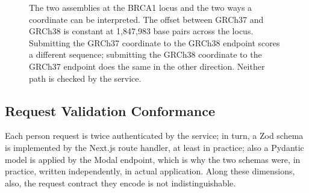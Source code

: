 \documentclass[10pt,journal]{IEEEtran}
\begin{document}
\begin{figure}[!t]
\centering
{}
\caption{The two assemblies at the BRCA1 locus and the two ways a coordinate can be interpreted. The offset between GRCh37 and GRCh38 is constant at 1{,}847{,}983 base pairs across the locus. Submitting the GRCh37 coordinate to the GRCh38 endpoint scores a different sequence; submitting the GRCh38 coordinate to the GRCh37 endpoint does the same in the other direction. Neither path is checked by the service.}
\label{fig:assembly}
\end{figure}

\subsection{Request Validation Conformance}
\label{sec:res-validation}

Each person request is twice authenticated by the service; in turn, a Zod schema is implemented by the Next.js route handler, at least in practice; also a Pydantic model is applied by the Modal endpoint, which is why the two schemas were, in practice, written independently, in actual application. Along these dimensions, also, the request contract they encode is not indistinguishable.
\end{document}
